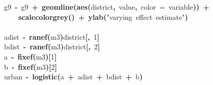 \documentclass{article}
\makeatletter
\newcommand{\hlnumber}[1]{\textcolor[rgb]{0,0,0}{#1}}%
\newcommand{\hlfunctioncall}[1]{\textcolor[rgb]{.5,0,.33}{\textbf{#1}}}%
\newcommand{\hlstring}[1]{\textcolor[rgb]{.6,.6,1}{#1}}%
\newcommand{\hlkeyword}[1]{\textbf{#1}}%
\newcommand{\hlargument}[1]{\textcolor[rgb]{.69,.25,.02}{#1}}%
\newcommand{\hlassignement}[1]{\textbf{#1}}%
\newcommand{\hlsymbol}[1]{#1}%
\newcommand{\hlstd}[1]{\textcolor[rgb]{0,0,0}{#1}}%
\newenvironment{kframe}{%
 \def\FrameCommand##1{\hskip\@totalleftmargin \hskip-\fboxsep
 \colorbox{shadecolor}{##1}\hskip-\fboxsep
     \hskip-\linewidth \hskip-\@totalleftmargin \hskip\columnwidth}%
 \MakeFramed {\advance\hsize-\width
   \@totalleftmargin\z@ \linewidth\hsize
   \@setminipage}}%
 {\par\unskip\endMakeFramed}
\newenvironment{knitrout}{}{} %
\makeatother
\begin{document}
\begin{knitrout}
{\begin{kframe}
\begin{flushleft}
\hlstd{}\hlsymbol{g9}{\ }\hlassignement{\usebox{\hlnormalsizeboxlessthan}-}{\ }\hlsymbol{g9}{\ }\hlkeyword{+}{\ }\hlfunctioncall{geom\usebox{\hlnormalsizeboxunderscore}line}\hlkeyword{(}\hlfunctioncall{aes}\hlkeyword{(}\hlsymbol{district}\hlkeyword{,}{\ }\hlsymbol{value}\hlkeyword{,}{\ }\hlargument{color}{\ }\hlargument{=}{\ }\hlsymbol{variable}\hlkeyword{)}\hlkeyword{)}{\ }\hlkeyword{+}\hspace*{\fill}\\
\hlstd{}{\ }{\ }{\ }{\ }\hlfunctioncall{scale\usebox{\hlnormalsizeboxunderscore}color\usebox{\hlnormalsizeboxunderscore}grey}\hlkeyword{(}\hlkeyword{)}{\ }\hlkeyword{+}{\ }\hlfunctioncall{ylab}\hlkeyword{(}\hlstring{"varying{\ }effect{\ }estimate"}\hlkeyword{)}\hspace*{\fill}\\
\hlstd{}\hspace*{\fill}\\
\hlstd{}\hlsymbol{a\usebox{\hlnormalsizeboxunderscore}dist}{\ }\hlassignement{\usebox{\hlnormalsizeboxlessthan}-}{\ }\hlfunctioncall{ranef}\hlkeyword{(}\hlsymbol{m3}\hlkeyword{)}\hlkeyword{\usebox{\hlnormalsizeboxdollar}}\hlsymbol{district}\hlkeyword{[}\hlkeyword{,}{\ }\hlnumber{1}\hlkeyword{]}\hspace*{\fill}\\
\hlstd{}\hlsymbol{b\usebox{\hlnormalsizeboxunderscore}dist}{\ }\hlassignement{\usebox{\hlnormalsizeboxlessthan}-}{\ }\hlfunctioncall{ranef}\hlkeyword{(}\hlsymbol{m3}\hlkeyword{)}\hlkeyword{\usebox{\hlnormalsizeboxdollar}}\hlsymbol{district}\hlkeyword{[}\hlkeyword{,}{\ }\hlnumber{2}\hlkeyword{]}\hspace*{\fill}\\
\hlstd{}\hlsymbol{a}{\ }\hlassignement{\usebox{\hlnormalsizeboxlessthan}-}{\ }\hlfunctioncall{fixef}\hlkeyword{(}\hlsymbol{m3}\hlkeyword{)}\hlkeyword{[}\hlnumber{1}\hlkeyword{]}\hspace*{\fill}\\
\hlstd{}\hlsymbol{b}{\ }\hlassignement{\usebox{\hlnormalsizeboxlessthan}-}{\ }\hlfunctioncall{fixef}\hlkeyword{(}\hlsymbol{m3}\hlkeyword{)}\hlkeyword{[}\hlnumber{2}\hlkeyword{]}\hspace*{\fill}\\
\hlstd{}\hlsymbol{urban}{\ }\hlassignement{\usebox{\hlnormalsizeboxlessthan}-}{\ }\hlfunctioncall{logistic}\hlkeyword{(}\hlsymbol{a}{\ }\hlkeyword{+}{\ }\hlsymbol{a\usebox{\hlnormalsizeboxunderscore}dist}{\ }\hlkeyword{+}{\ }\hlsymbol{b\usebox{\hlnormalsizeboxunderscore}dist}{\ }\hlkeyword{+}{\ }\hlsymbol{b}\hlkeyword{)}\hspace*{\fill}\\

\end{flushleft}
\end{kframe}}
\end{knitrout}
\end{document}
